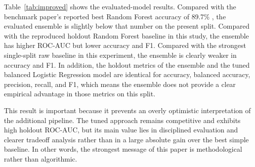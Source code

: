 \documentclass[conference]{IEEEtran}
\begin{document}
Table~\ref{tab:improved} shows the evaluated-model results. Compared with the benchmark paper's reported best Random Forest accuracy of 89.7\% \cite{nasution2025heart}, the evaluated ensemble is slightly below that number on the present split. Compared with the reproduced holdout Random Forest baseline in this study, the ensemble has higher ROC-AUC but lower accuracy and F1. Compared with the strongest single-split raw baseline in this experiment, the ensemble is clearly weaker in accuracy and F1. In addition, the holdout metrics of the ensemble and the tuned balanced Logistic Regression model are identical for accuracy, balanced accuracy, precision, recall, and F1, which means the ensemble does not provide a clear empirical advantage in those metrics on this split.

This result is important because it prevents an overly optimistic interpretation of the additional pipeline. The tuned approach remains competitive and exhibits high holdout ROC-AUC, but its main value lies in disciplined evaluation and clearer tradeoff analysis rather than in a large absolute gain over the best simple baseline. In other words, the strongest message of this paper is methodological rather than algorithmic.

\begin{table}[!t]
\caption{Training-partition cross-validated tuned models and holdout results}
\label{tab:improved}
\centering
\footnotesize
\setlength{\tabcolsep}{4pt}
\end{table}
\end{document}
